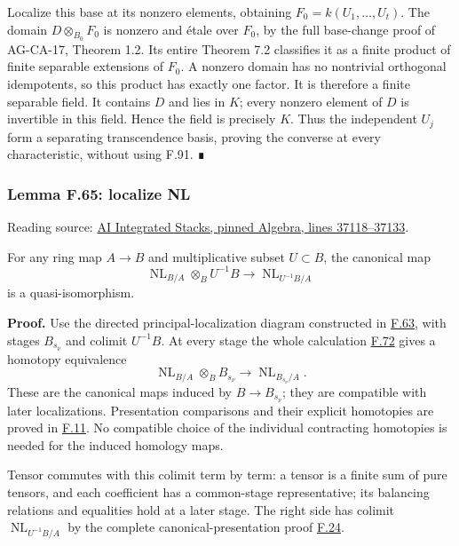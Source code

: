 \documentclass[11pt,a4paper,openany]{report}
\begin{document}
Localize this base at its nonzero elements, obtaining \(F_0=k(U_1,\ldots,U_t)\). The domain \(D\otimes_{B_0}F_0\) is nonzero and étale over \(F_0\), by the full base-change proof of AG-CA-17, Theorem 1.2. Its entire Theorem 7.2 classifies it as a finite product of finite separable extensions of \(F_0\). A nonzero domain has no nontrivial orthogonal idempotents, so this product has exactly one factor. It is therefore a finite separable field. It contains \(D\) and lies in \(K\); every nonzero element of \(D\) is invertible in this field. Hence the field is precisely \(K\). Thus the independent \(U_j\) form a separating transcendence basis, proving the converse at every characteristic, without using F.91. ∎

\label{AG-RG-S05-algebra-lemma-localize-NL}

\subsubsection{Lemma F.65: localize NL}\label{AG-RG-S05-lemma-f.65-localize-nl}

Reading source: \href{https://github.com/KokunoYumeto/unofficial-stacks-project-ai-drafts/blob/565b10e987aba5969b21145a0833f42d69f96790/algebra.tex\#L37118-L37133}{AI Integrated Stacks, pinned Algebra, lines 37118--37133}.

For any ring map \(A\to B\) and multiplicative subset \(U\subset B\), the canonical map \[\operatorname{NL}_{B/A}\otimes_B U^{-1}B
\longrightarrow \operatorname{NL}_{U^{-1}B/A}\] is a quasi-isomorphism.

\textbf{Proof.} Use the directed principal-localization diagram constructed in \hyperref[AG-RG-S05-algebra-lemma-localization-colimit]{F.63}, with stages \(B_{s_\nu}\) and colimit \(U^{-1}B\). At every stage the whole calculation \hyperref[AG-RG-S05-algebra-lemma-principal-localization-NL]{F.72} gives a homotopy equivalence \[\operatorname{NL}_{B/A}\otimes_B B_{s_\nu}
\longrightarrow\operatorname{NL}_{B_{s_\nu}/A}.\] These are the canonical maps induced by \(B\to B_{s_\nu}\); they are compatible with later localizations. Presentation comparisons and their explicit homotopies are proved in \hyperref[AG-RG-S05-algebra-lemma-NL-homotopy]{F.11}. No compatible choice of the individual contracting homotopies is needed for the induced homology maps.

Tensor commutes with this colimit term by term: a tensor is a finite sum of pure tensors, and each coefficient has a common-stage representative; its balancing relations and equalities hold at a later stage. The right side has colimit \(\operatorname{NL}_{U^{-1}B/A}\) by the complete canonical-presentation proof \hyperref[AG-RG-S05-algebra-lemma-colimits-NL]{F.24}.
\end{document}
